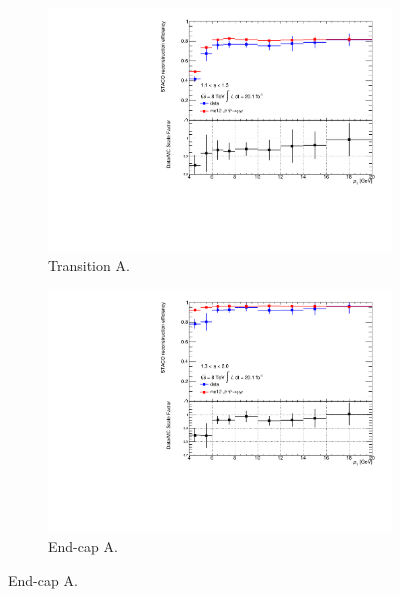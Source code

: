 \begin{figure}[htbp]
    \begin{subfigure}[b]{0.45\textwidth}
      \includegraphics[width=\textwidth]{PartCalibration2012/Plots/SFPlots/Transition_A_reco.pdf}
      \caption{Transition A.}\label{fig:CalibrationRecoSFTransitionA}
    \end{subfigure}
    \hfill
    \begin{subfigure}[b]{0.45\textwidth}
      \includegraphics[width=\textwidth]{PartCalibration2012/Plots/SFPlots/Endcap_A_reco.pdf}
      \caption{End-cap A.}\label{fig:CalibrationRecoSFEndcapA}
    \end{subfigure}


\end{figure}

